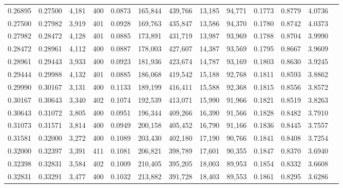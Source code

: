 \begin{tabular}{rrrrrrrrrrrrr}
0.26895 & 0.27500 &  4,181 &   400 &                                     0.0873 & 165,844 & 439,766 &  13,185 &  94,771 & 0.1773 & 0.8779 & 4.0736 \\
0.27500 & 0.27982 &  3,919 &   401 &                                     0.0928 & 169,763 & 435,847 &  13,586 &  94,370 & 0.1780 & 0.8742 & 4.0373 \\
0.27982 & 0.28472 &  4,128 &   401 &                                     0.0885 & 173,891 & 431,719 &  13,987 &  93,969 & 0.1788 & 0.8704 & 3.9990 \\
0.28472 & 0.28961 &  4,112 &   400 &                                     0.0887 & 178,003 & 427,607 &  14,387 &  93,569 & 0.1795 & 0.8667 & 3.9609 \\
0.28961 & 0.29443 &  3,933 &   400 &                                     0.0923 & 181,936 & 423,674 &  14,787 &  93,169 & 0.1803 & 0.8630 & 3.9245 \\
0.29444 & 0.29988 &  4,132 &   401 &                                     0.0885 & 186,068 & 419,542 &  15,188 &  92,768 & 0.1811 & 0.8593 & 3.8862 \\
0.29990 & 0.30167 &  3,131 &   400 &                                     0.1133 & 189,199 & 416,411 &  15,588 &  92,368 & 0.1815 & 0.8556 & 3.8572 \\
0.30167 & 0.30643 &  3,340 &   402 &                                     0.1074 & 192,539 & 413,071 &  15,990 &  91,966 & 0.1821 & 0.8519 & 3.8263 \\
0.30643 & 0.31072 &  3,805 &   400 &                                     0.0951 & 196,344 & 409,266 &  16,390 &  91,566 & 0.1828 & 0.8482 & 3.7910 \\
0.31073 & 0.31571 &  3,814 &   400 &                                     0.0949 & 200,158 & 405,452 &  16,790 &  91,166 & 0.1836 & 0.8445 & 3.7557 \\
0.31581 & 0.32000 &  3,272 &   400 &                                     0.1089 & 203,430 & 402,180 &  17,190 &  90,766 & 0.1841 & 0.8408 & 3.7254 \\
0.32000 & 0.32397 &  3,391 &   411 &                                     0.1081 & 206,821 & 398,789 &  17,601 &  90,355 & 0.1847 & 0.8370 & 3.6940 \\
0.32398 & 0.32831 &  3,584 &   402 &                                     0.1009 & 210,405 & 395,205 &  18,003 &  89,953 & 0.1854 & 0.8332 & 3.6608 \\
0.32831 & 0.33291 &  3,477 &   400 &                                     0.1032 & 213,882 & 391,728 &  18,403 &  89,553 & 0.1861 & 0.8295 & 3.6286 \\

\end{tabular}
